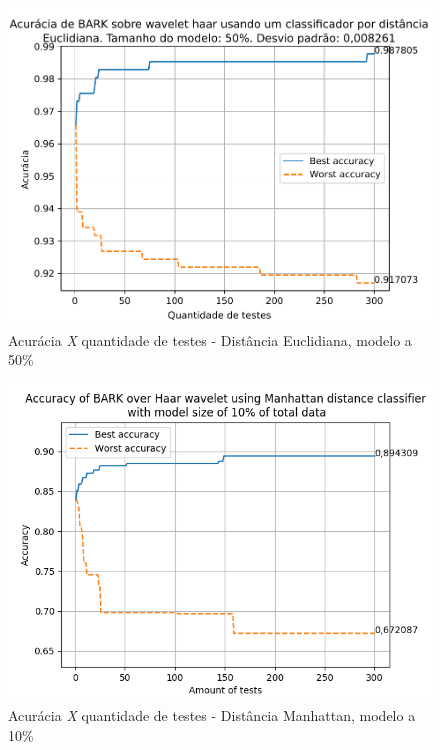 \begin{myenv}{1.5}
			\newpage
			\begin{figure}[h]
				\centering
				\includegraphics{images/results/confusionMatrices/classifier_Euclidian_50}
				\caption{Acurácia \textit{X} quantidade de testes - Distância Euclidiana, modelo a 50\%}
				\label{fig:classifiereuclidian50}
			\end{figure}
			
		
			\newpage
			\begin{figure}[h]
				\centering
				\includegraphics{images/results/confusionMatrices/classifier_Manhattan_10.png}
				\caption{Acurácia \textit{X} quantidade de testes - Distância Manhattan, modelo a 10\%}
				\label{fig:classifiermanhattan10}
			\end{figure}
			
		

\end{myenv}
